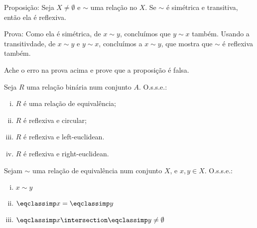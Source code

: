 \begin{exercise}
	Proposição: Seja $X \neq \emptyset$ e $\sim$ uma relação no $X$. Se $\sim$ é simétrica e transitiva, então ela é reflexiva.

	Prova: Como ela é simétrica, de $x \sim y$, concluímos que $y \sim x$ também. Usando a transitivdade, de $x \sim y$ e $y \sim x$, concluímos a $x \sim y$, que mostra que $\sim$ é reflexiva também.

	Ache o erro na prova acima e prove que a proposição é falsa.
\end{exercise}

\begin{exercise}
	Seja $R$ uma relação binária num conjunto $A$. O.s.s.e.:
	\begin{enumerate}[(i)]
		\item $R$ é uma relação de equivalência;
		\item $R$ é reflexiva e circular;
		\item $R$ é reflexiva e left-euclidean.
		\item $R$ é reflexiva e right-euclidean.
	\end{enumerate}
\end{exercise}

\begin{exercise}
	Sejam $\sim$ uma relação de equivalência num conjunto $X$, e $x, y \in X$. O.s.s.e.:
	\begin{enumerate}[(i)]
		\item $x \sim y$
		\item $\eqclassimp x = \eqclassimp y$
		\item $\eqclassimp x \intersection \eqclassimp y \neq \emptyset$
	\end{enumerate}
\end{exercise}
